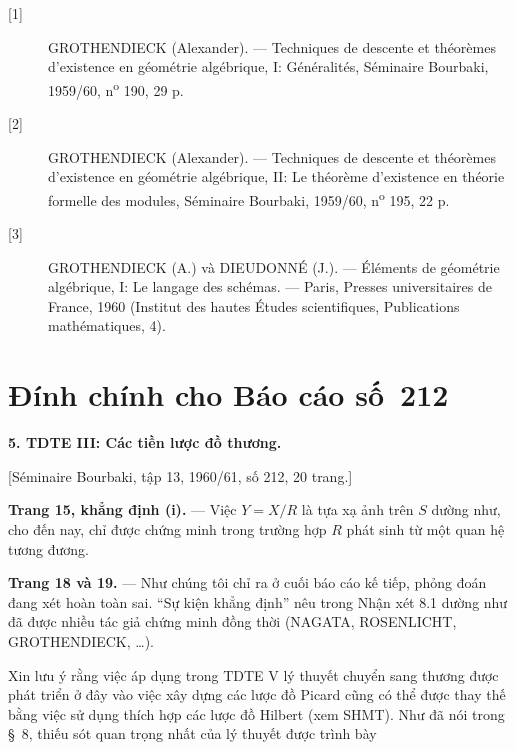 \documentclass[11pt,twoside,openany]{book}
\numberwithin{equation}{section}
\newcommand{\src}[1]{%
  \phantomsection\hypertarget{src:\fgasourceid:#1}{}%
  \marginpar{\raggedleft\footnotesize\sffamily #1}%
}
\newcommand{\fgasourceid}{unset}
\newcommand{\sid}[1]{\gdef\fgasourceid{#1}\phantomsection\hypertarget{fga:#1}{}}
\begin{document}
\begin{description}
\item[{[1]}] GROTHENDIECK (Alexander). --- Techniques de descente et théorèmes
d'existence en géométrie algébrique, I: Généralités, Séminaire Bourbaki,
1959/60, n\textsuperscript{o} 190, 29 p.

\item[{[2]}] GROTHENDIECK (Alexander). --- Techniques de descente et théorèmes
d'existence en géométrie algébrique, II: Le théorème d'existence en théorie
formelle des modules, Séminaire Bourbaki, 1959/60,
n\textsuperscript{o} 195, 22 p.

\item[{[3]}] GROTHENDIECK (A.) và DIEUDONNÉ (J.). --- Éléments de géométrie
algébrique, I: Le langage des schémas. --- Paris, Presses universitaires de
France, 1960 (Institut des hautes Études scientifiques, Publications
mathématiques, 4).
\end{description}

\par

\clearpage
\chapter*{Đính chính cho Báo cáo số~212}
\setcounter{footnote}{2}
\sid{e212}
\src{301}

\noindent\textbf{5. TDTE III: Các tiền lược đồ thương.}

\begin{center}
[Séminaire Bourbaki, tập 13, 1960/61, số 212, 20 trang.]
\end{center}

\noindent\textbf{Trang 15, khẳng định (i).} --- Việc $Y=X/R$ là tựa xạ ảnh
trên $S$ dường như, cho đến nay, chỉ được chứng minh trong trường hợp $R$
phát sinh từ một quan hệ tương đương.

\noindent\textbf{Trang 18 và 19.} --- Như chúng tôi chỉ ra ở cuối báo cáo kế
tiếp, phỏng đoán đang xét hoàn toàn sai. ``Sự kiện khẳng định'' nêu trong Nhận
xét 8.1 dường như đã được nhiều tác giả chứng minh đồng thời (NAGATA,
ROSENLICHT, GROTHENDIECK, \ldots).

Xin lưu ý rằng việc áp dụng trong TDTE V lý thuyết chuyển sang thương được
phát triển ở đây vào việc xây dựng các lược đồ Picard cũng có thể được thay
thế bằng việc sử dụng thích hợp các lược đồ Hilbert (xem SHMT). Như đã nói
trong §~8, thiếu sót quan trọng nhất của lý thuyết được trình bày
\end{document}
